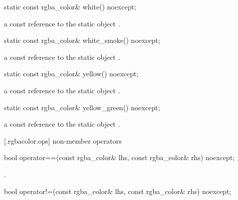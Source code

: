 \begin{itemdecl}
    static const rgba_color& white() noexcept;
\end{itemdecl}
\begin{itemdescr}
    \pnum
    \returns
    a const reference to the static  object .
\end{itemdescr}

\begin{itemdecl}
    static const rgba_color& white_smoke() noexcept;
\end{itemdecl}
\begin{itemdescr}
    \pnum
    \returns
    a const reference to the static  object .
\end{itemdescr}

\begin{itemdecl}
    static const rgba_color& yellow() noexcept;
\end{itemdecl}
\begin{itemdescr}
    \pnum
    \returns
    a const reference to the static  object .
\end{itemdescr}

\begin{itemdecl}
    static const rgba_color& yellow_green() noexcept;
\end{itemdecl}
\begin{itemdescr}
    \pnum
    \returns
    a const reference to the static  object .
\end{itemdescr}

 [\iotwod.rgbacolor.ops] { non-member operators}

%
%
\begin{itemdecl}
bool operator==(const rgba_color& lhs, const rgba_color& rhs) noexcept;
\end{itemdecl}
\begin{itemdescr}
	\pnum
	\returns
	.
\end{itemdescr}

%
%
\begin{itemdecl}
bool operator!=(const rgba_color& lhs, const rgba_color& rhs) noexcept;
\end{itemdecl}
\begin{itemdescr}
	\pnum
	\returns
\end{itemdescr}
